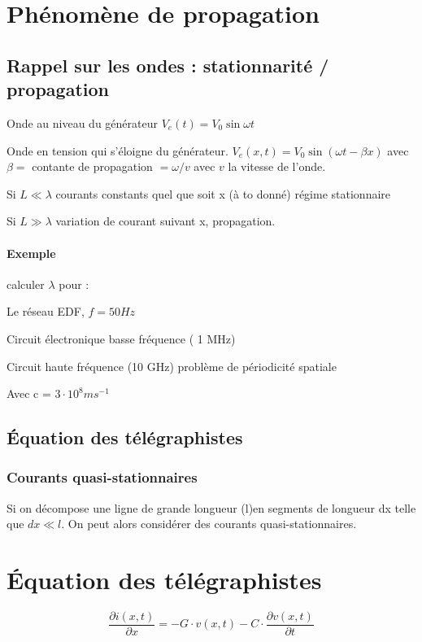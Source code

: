 \documentclass[12pt,a4paper]{report}
\newcommand{\E}[1]{\cdot 10^{#1}}
\begin{document}
\section{Phénomène de propagation}

\subsection{Rappel sur les ondes : stationnarité / propagation}

Onde au niveau du générateur $ V_e(t) = V_0 \sin \omega t$

Onde en tension qui s'éloigne du générateur. $ V_e (x, t) = V_0 \sin (\omega t - \beta x)$ avec $ \beta = $ contante de propagation $ = \omega / v$ avec $v$ la vitesse de l'onde.

Si $L \ll \lambda$ courants constants quel que soit x (à to donné) régime stationnaire

Si $L \gg \lambda$ variation de courant suivant x, propagation.

\paragraph{Exemple} calculer $\lambda$ pour :

Le réseau EDF, $f = 50Hz$

Circuit électronique basse fréquence ( 1 MHz)

Circuit haute fréquence (10 GHz) problème de périodicité spatiale

Avec c = $3 \E{8} ms^{-1}$

\subsection{Équation des télégraphistes}

\subsubsection{Courants quasi-stationnaires}

Si on décompose une ligne de grande longueur (l)en segments de longueur dx telle que $dx \ll l$. On peut alors considérer des courants quasi-stationnaires.

\section{Équation des télégraphistes}

\[
	\dfrac{\partial i(x,t)}{\partial x} = - G \cdot v(x,t) - C \cdot \dfrac{\partial v(x,t)}{\partial t}
\]
\end{document}
